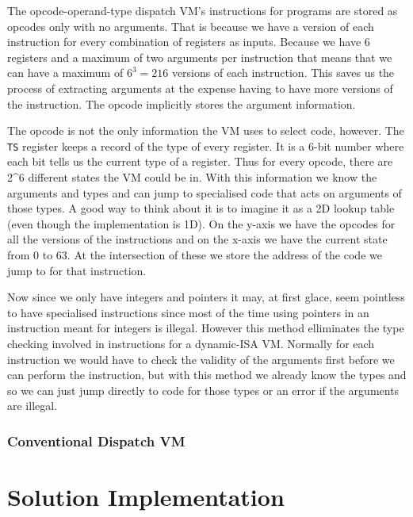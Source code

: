 \documentclass[english,a4paper]{article}
\begin{document}
The opcode-operand-type dispatch VM's instructions for programs are
stored as opcodes only with no arguments. That is because we have a
version of each instruction for every combination of registers as
inputs. Because we have 6 registers and a maximum of two arguments per
instruction that means that we can have a maximum of $6^3 = 216$
versions of each instruction. This saves us the process of extracting
arguments at the expense having to have more versions of the
instruction. The opcode implicitly stores the argument information.

The opcode is not the only information the VM uses to select code,
however. The \verb|TS| register keeps a record of the type of every
register. It is a 6-bit number where each bit tells us the current
type of a register. Thus for every opcode, there are
2\textasciicircum{}6 different states the VM could be in. With this
information we know the arguments and types and can jump to
specialised code that acts on arguments of those types. A good way to
think about it is to imagine it as a 2D lookup table (even though the
implementation is 1D). On the y-axis we have the opcodes for all the
versions of the instructions and on the x-axis we have the current
state from 0 to 63. At the intersection of these we store the address
of the code we jump to for that instruction.

Now since we only have integers and pointers it may, at first glace,
seem pointless to have specialised instructions since most of the time
using pointers in an instruction meant for integers is
illegal. However this method elliminates the type checking involved in
instructions for a dynamic-ISA VM. Normally for each instruction we
would have to check the validity of the arguments first before we can
perform the instruction, but with this method we already know the
types and so we can just jump directly to code for those types or an
error if the arguments are illegal.

\subsubsection{Conventional Dispatch VM}

\section{Solution Implementation}

\subsection{}
\end{document}
